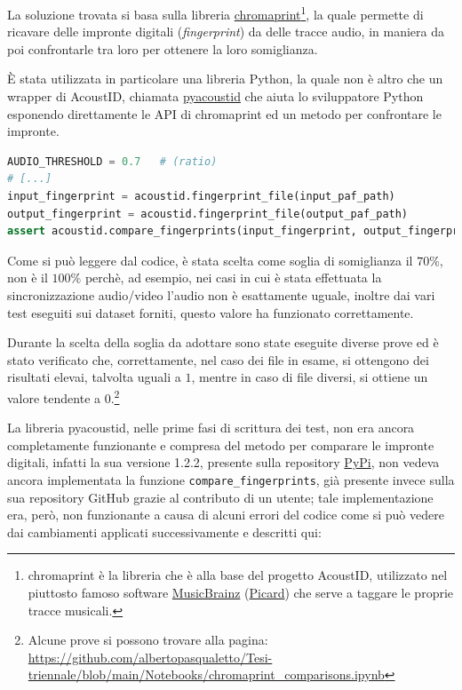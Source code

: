 La soluzione trovata si basa sulla libreria \href{https://acoustid.org/chromaprint}{chromaprint}\footnote{chromaprint è la libreria che è alla base del progetto AcoustID, utilizzato nel piuttosto famoso software \href{https://musicbrainz.org/}{MusicBrainz} (\href{https://picard.musicbrainz.org/}{Picard}) che serve a taggare le proprie tracce musicali.}, la quale permette di ricavare delle impronte digitali (\textit{fingerprint}) da delle tracce audio, in maniera da poi confrontarle tra loro per ottenere la loro somiglianza.    %

È stata utilizzata in particolare una libreria Python, la quale non è altro che un wrapper di AcoustID, chiamata \href{https://github.com/beetbox/pyacoustid}{pyacoustid} che aiuta lo sviluppatore Python esponendo direttamente le API di chromaprint ed un metodo per confrontare le impronte.

\begin{lstlisting}[language=Python, caption=Test di comparazione di due file audio tramite la loro impronta digitale]
AUDIO_THRESHOLD = 0.7   # (ratio)
# [...]
input_fingerprint = acoustid.fingerprint_file(input_paf_path)
output_fingerprint = acoustid.fingerprint_file(output_paf_path)
assert acoustid.compare_fingerprints(input_fingerprint, output_fingerprint) > AUDIO_THRESHOLD, "PreservationAudioFile.wav is not the same as input"
\end{lstlisting}

Come si può leggere dal codice, è stata scelta come soglia di somiglianza il $70\%$, non è il $100\%$ perchè, ad esempio, nei casi in cui è stata effettuata la sincronizzazione audio/video l'audio non è esattamente uguale, inoltre dai vari test eseguiti sui dataset forniti, questo valore ha funzionato correttamente.

Durante la scelta della soglia da adottare sono state eseguite diverse prove ed è stato verificato che, correttamente, nel caso dei file in esame, si ottengono dei risultati elevai, talvolta uguali a $1$, mentre in caso di file diversi, si ottiene un valore tendente a $0$.\footnote{Alcune prove si possono trovare alla pagina: \url{https://github.com/albertopasqualetto/Tesi-triennale/blob/main/Notebooks/chromaprint_comparisons.ipynb}}   %

La libreria pyacoustid, nelle prime fasi di scrittura dei test, non era ancora completamente funzionante e compresa del metodo per comparare le impronte digitali, infatti la sua versione 1.2.2, presente sulla repository \href{https://pypi.org/}{PyPi}, non vedeva ancora implementata la funzione \verb|compare_fingerprints|, già presente invece sulla sua repository GitHub grazie al contributo di un utente; tale implementazione era, però, non funzionante a causa di alcuni errori del codice come si può vedere dai cambiamenti applicati successivamente e descritti qui: 

